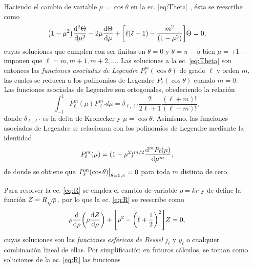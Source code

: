 \documentclass[letterpaper,11pt] {article}
\begin{document}
Haciendo el cambio de variable $\mu = \cos\theta$ en la ec. \eqref{eq:Theta} , ésta se reescribe como
	\begin{equation*}
	\qty(1-\mu^2) \dv[2]{\Theta}{\mu} - 2 \mu \dv{\Theta}{\mu} + \qty[\ell(\ell+1)-\frac{m^2}{(1-\mu^2)}]\Theta= 0,
	\end{equation*}
cuyas soluciones que cumplen con ser finitas en $\theta = 0$ y $\theta = \pi$ ---o bien $\mu=\pm1$--- imponen que $\ell = m, m+1,m+2,\ldots$. Las soluciones a la ec. \eqref{eq:Theta} son entonces las \emph{funciones asociadas de Legendre} $P_\ell^m(\cos\theta)$ de grado $\ell$ y orden $m$, las cuales se reducen a los polinomios de Legendre $P_\ell(\cos\theta)$ cuando $m=0$. Las funciones asociadas de Legendre son ortogonales, obedeciendo la relación
	\begin{equation}
	\int_{-1}^1P_\ell^m(\mu) P_{\ell'}^md\mu = \delta_{\ell,\ell'}\frac{2}{2\ell+1}\frac{(\ell+m)!}{(\ell-m)!},
	\label{eq:ortLegendre}
	\end{equation}
donde $\delta_{\ell,\ell'}$ es la delta de Kronecker y $\mu=\cos\theta$. Asimismo, las funciones asociadas de Legendre se relacionan con los polinomios de Legendre mediante la identidad
	\begin{equation}
	P_\ell^m (\mu) = (1-\mu^2)^{m/2}\dv[m]{P_\ell(\mu)}{\mu},
	\label{eq:FAL-PL}
	\end{equation}
de donde se obtiene que $\eval{P_\ell^m(\cos\theta)}_{\theta=0,\pi}=0$ para toda $m$ distinta de cero. %

Para resolver la ec. \eqref{eq:R} se emplea el cambio de variable $\rho = k r$ y de define la función $Z =R\sqrt{\rho}$, por lo que la ec. \eqref{eq:R} se reescribe como
	\begin{equation}
	\rho \dv{\rho}\qty(\rho\dv{Z}{\rho})+\qty[\rho^2-\qty(\ell+\frac12)^2] Z = 0,
	\end{equation}
cuyas soluciones son las \emph{funciones esféricas de Bessel} $j_\ell$ y $y_\ell$ o cualquier combinación lineal de ellas. Por simplificación en futuros cálculos, se toman como soluciones de la ec. \eqref{eq:R} las funciones\\
\end{document}

